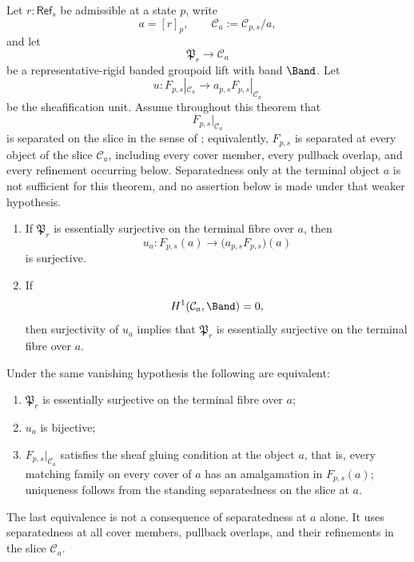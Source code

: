 \begin{theorem}\label{thm:canonical-lift-rigidity}
Let $r:\mathsf{Ref}_s$ be admissible at a state $p$, write
\[
a=[r]_p,
\qquad
\mathcal C_a:=\mathcal C_{p,s}/a,
\]
and let
\[
\mathfrak P_r\to \mathcal C_a
\]
be a representative-rigid banded groupoid lift with band $\Band$. Let
\[
u:F_{p,s}|_{\mathcal C_a}\longrightarrow a_{p,s}F_{p,s}|_{\mathcal C_a}
\]
be the sheafification unit. Assume throughout this theorem that
\[
F_{p,s}|_{\mathcal C_a}
\]
is separated on the slice in the sense of
; equivalently, $F_{p,s}$ is
separated at every object of the slice $\mathcal C_a$, including every
cover member, every pullback overlap, and every refinement occurring below.
Separatedness only at the terminal object $a$ is not sufficient for this
theorem, and no assertion below is made under that weaker hypothesis.
\begin{enumerate}[label=(\roman*),nosep]
\item If $\mathfrak P_r$ is essentially surjective on the terminal fibre over $a$, then
\[
u_a:F_{p,s}(a)\to \bigl(a_{p,s}F_{p,s}\bigr)(a)
\]
is surjective.
\item If
\[
H^1(\mathcal C_a,\Band)=0,
\]
then surjectivity of $u_a$ implies that $\mathfrak P_r$ is essentially
surjective on the terminal fibre over $a$.
\end{enumerate}
Under the same vanishing hypothesis the following are equivalent:
\begin{enumerate}[label=(\alph*),nosep]
\item $\mathfrak P_r$ is essentially surjective on the terminal fibre over $a$;
\item $u_a$ is bijective;
\item $F_{p,s}|_{\mathcal C_a}$ satisfies the sheaf gluing condition at
the object $a$, that is, every matching family on every cover of $a$ has
an amalgamation in $F_{p,s}(a)$; uniqueness follows from the standing
separatedness on the slice at $a$.
\end{enumerate}
The last equivalence is not a consequence of separatedness at \(a\) alone.
It uses separatedness at all cover members, pullback overlaps, and their
refinements in the slice \(\mathcal C_a\).
\end{theorem}

